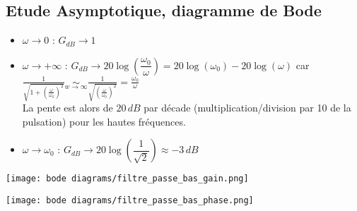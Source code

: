 \documentclass{article}
\begin{document}
\subsection{Etude Asymptotique, diagramme de Bode}
\begin{itemize}[label=$\ast$]
    \item $\omega \rightarrow 0$ : $G_{dB} \rightarrow 1$
    \item $\omega \rightarrow +\infty$ : $G_{dB} \rightarrow 20\log{\left(\dfrac{\omega_0}{\omega}\right)} = 20\log{(\omega_0)} - 20\log{(\omega)}$ \quad
    car $\frac{1}{\sqrt{1+\left(\frac{\omega}{\omega_0}\right)^2}} \underset{w \to \infty}{\sim} \frac{1}{\sqrt{\left(\frac{\omega}{\omega_0}\right)^2}} = \frac{\omega_0}{\omega} $\\
    La pente est alors de $20\,dB$ par décade (multiplication/division par 10 de la pulsation) pour les hautes fréquences.
    \item $\omega \rightarrow \omega_0$ : $G_{dB} \rightarrow 20\log{\left(\dfrac{1}{\sqrt{2}}\right)} \approx -3\,dB$
\end{itemize}

    \texttt{[image: bode diagrams/filtre\_passe\_bas\_gain.png]}
    
    \texttt{[image: bode diagrams/filtre\_passe\_bas\_phase.png]}
\end{document}
